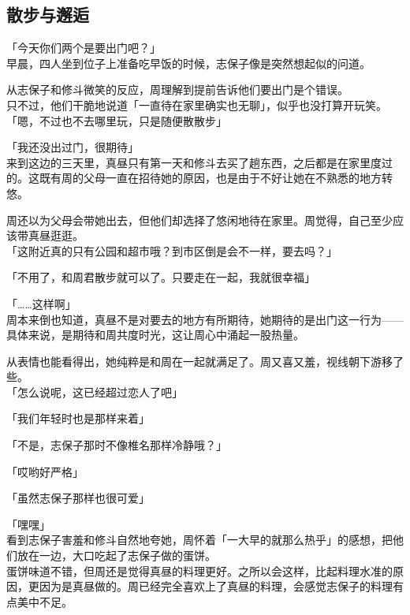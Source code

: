 \subsection{散步与邂逅}

「今天你们两个是要出门吧？」\\

早晨，四人坐到位子上准备吃早饭的时候，志保子像是突然想起似的问道。

从志保子和修斗微笑的反应，周理解到提前告诉他们要出门是个错误。\\

只不过，他们干脆地说道「一直待在家里确实也无聊」，似乎也没打算开玩笑。\\

「嗯，不过也不去哪里玩，只是随便散散步」

「我还没出过门，很期待」\\

来到这边的三天里，真昼只有第一天和修斗去买了趟东西，之后都是在家里度过的。这既有周的父母一直在招待她的原因，也是由于不好让她在不熟悉的地方转悠。

周还以为父母会带她出去，但他们却选择了悠闲地待在家里。周觉得，自己至少应该带真昼逛逛。\\

「这附近真的只有公园和超市哦？到市区倒是会不一样，要去吗？」

「不用了，和周君散步就可以了。只要走在一起，我就很幸福」

「……这样啊」\\

周本来倒也知道，真昼不是对要去的地方有所期待，她期待的是出门这一行为——具体来说，是期待和周共度时光，这让周心中涌起一股热量。

从表情也能看得出，她纯粹是和周在一起就满足了。周又喜又羞，视线朝下游移了些。\\

「怎么说呢，这已经超过恋人了吧」

「我们年轻时也是那样来着」

「不是，志保子那时不像椎名那样冷静哦？」

「哎哟好严格」

「虽然志保子那样也很可爱」

「嘿嘿」\\

看到志保子害羞和修斗自然地夸她，周怀着「一大早的就那么热乎」的感想，把他们放在一边，大口吃起了志保子做的蛋饼。\\

蛋饼味道不错，但周还是觉得真昼的料理更好。之所以会这样，比起料理水准的原因，更因为是真昼做的。周已经完全喜欢上了真昼的料理，会感觉志保子的料理有点美中不足。\\

